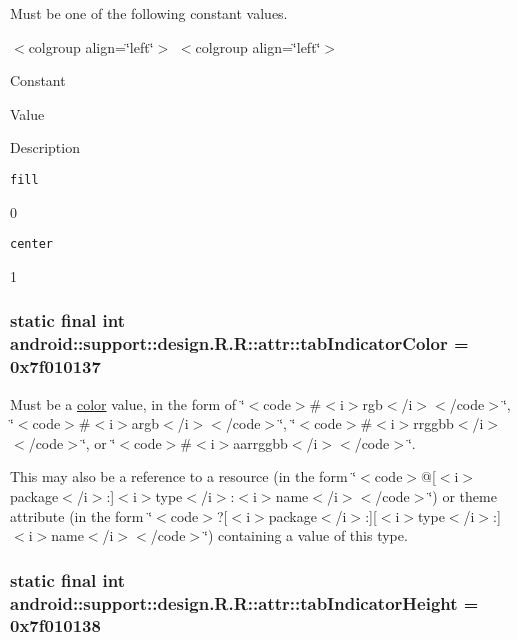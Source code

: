 Must be one of the following constant values. \begin{TabularC}{0}
\hline
\end{TabularC}
$<$colgroup align=\char`\"{}left\char`\"{}$>$ $<$colgroup align=\char`\"{}left\char`\"{}$>$ 

Constant

Value

Description 

{\tt fill}

0

{\tt center}

1\hypertarget{classandroid_1_1support_1_1design_1_1_r_1_1attr_d58ae71f80d510a9181f890ec7462335}{
\subsubsection[{tabIndicatorColor}]{\setlength{\rightskip}{0pt plus 5cm}static final int android::support::design.R.R::attr::tabIndicatorColor = 0x7f010137}}
\label{classandroid_1_1support_1_1design_1_1_r_1_1attr_d58ae71f80d510a9181f890ec7462335}


Must be a \hyperlink{classandroid_1_1support_1_1design_1_1_r_1_1color}{color} value, in the form of \char`\"{}$<$code$>$\#$<$i$>$rgb$<$/i$>$$<$/code$>$\char`\"{}, \char`\"{}$<$code$>$\#$<$i$>$argb$<$/i$>$$<$/code$>$\char`\"{}, \char`\"{}$<$code$>$\#$<$i$>$rrggbb$<$/i$>$$<$/code$>$\char`\"{}, or \char`\"{}$<$code$>$\#$<$i$>$aarrggbb$<$/i$>$$<$/code$>$\char`\"{}. 

This may also be a reference to a resource (in the form \char`\"{}$<$code$>$@\mbox{[}$<$i$>$package$<$/i$>$:\mbox{]}$<$i$>$type$<$/i$>$:$<$i$>$name$<$/i$>$$<$/code$>$\char`\"{}) or theme attribute (in the form \char`\"{}$<$code$>$?\mbox{[}$<$i$>$package$<$/i$>$:\mbox{]}\mbox{[}$<$i$>$type$<$/i$>$:\mbox{]}$<$i$>$name$<$/i$>$$<$/code$>$\char`\"{}) containing a value of this type. \hypertarget{classandroid_1_1support_1_1design_1_1_r_1_1attr_c147c3fcb3b846ffb0768034956acfdb}{
\subsubsection[{tabIndicatorHeight}]{\setlength{\rightskip}{0pt plus 5cm}static final int android::support::design.R.R::attr::tabIndicatorHeight = 0x7f010138}}
\label{classandroid_1_1support_1_1design_1_1_r_1_1attr_c147c3fcb3b846ffb0768034956acfdb}


